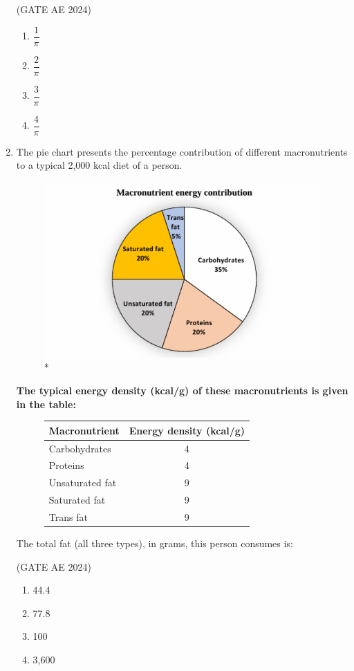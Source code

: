\documentclass[journal,12pt,onecolumn]{IEEEtran}
\theoremstyle{remark}
\begin{document}
\begin{flushleft}
\begin{enumerate}
\hfill (GATE AE 2024)

\begin{enumerate}
    \item $\dfrac{1}{\pi}$
    \item $\dfrac{2}{\pi}$
    \item $\dfrac{3}{\pi}$ 
    \item $\dfrac{4}{\pi}$
\end{enumerate} 

\item The pie chart presents the percentage contribution of different macronutrients to a typical 2,000 kcal diet of a person.
\begin{figure}[H]
    
    \includegraphics[width=0.5\columnwidth]{figs/pie chart.png}
    \caption{*}
    \label{fig:placeholder}
\end{figure}

\textbf{The typical energy density (kcal/g) of these macronutrients is given in the table:}
\begin{figure}
\begin{tabular}{|l|c|}
\hline
\textbf{Macronutrient} & \textbf{Energy density (kcal/g)} \\
\hline
Carbohydrates & 4 \\
Proteins & 4 \\
Unsaturated fat & 9 \\
Saturated fat & 9 \\
Trans fat & 9 \\
\hline
\end{tabular}
\end{figure}

The total fat (all three types), in grams, this person consumes is: 

\hfill (GATE AE 2024)

    \begin{enumerate}
        \item 44.4
        \item 77.8
        \item 100
        \item 3,600
 \end{enumerate}


\end{enumerate}
\end{flushleft}
\end{document}

